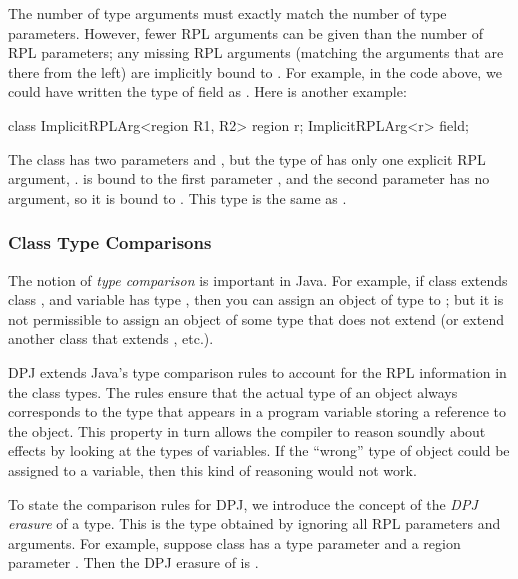The number of type arguments must exactly match the number of type
parameters.  However, fewer RPL arguments can be given than the number
of RPL parameters; any missing RPL arguments (matching the arguments
that are there from the left) are implicitly bound to .  For
example, in the code above, we could have written the type of field
 as .  Here is another example:
%
\begin{dpjlisting}
class ImplicitRPLArg<region R1, R2> {
    region r;
    ImplicitRPLArg<r> field;
}
\end{dpjlisting}
%
The class  has two parameters  and
, but the type  of  has only
one explicit RPL argument, .   is bound to the first
parameter , and the second parameter has no argument, so it is
bound to .  This type is the same as
.

\subsubsection{Class Type Comparisons%
\label{sec:types:class:compare}}

The notion of \emph{type comparison} is important in Java.  For
example, if class  extends class , and variable 
has type , then you can assign an object of type  to
; but it is not permissible to assign an object of some type
 that does not extend  (or extend another class that
extends , etc.).

DPJ extends Java's type comparison rules to account for the RPL
information in the class types.  The rules ensure that the actual type
of an object always corresponds to the type that appears in a program
variable storing a reference to the object.  This property in turn
allows the compiler to reason soundly about effects by looking at the
types of variables.  If the ``wrong'' type of object could be assigned
to a variable, then this kind of reasoning would not work.

To state the comparison rules for DPJ, we introduce the concept of the
\emph{DPJ erasure} of a type.  This is the type obtained by ignoring
all RPL parameters and arguments.  For example, suppose class 
has a type parameter  and a region parameter .  Then the
DPJ erasure of  is .

